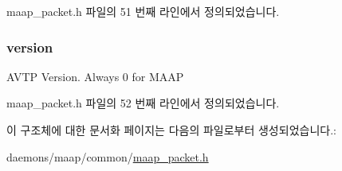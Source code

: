 maap\+\_\+packet.\+h 파일의 51 번째 라인에서 정의되었습니다.

\subsubsection[{\texorpdfstring{version}{version}}]{ version}\hypertarget{struct_m_a_a_p___packet_ab22abc2906422da61885ac6c8e6a1a59}{}\label{struct_m_a_a_p___packet_ab22abc2906422da61885ac6c8e6a1a59}
A\+V\+TP Version. Always 0 for M\+A\+AP 

maap\+\_\+packet.\+h 파일의 52 번째 라인에서 정의되었습니다.



이 구조체에 대한 문서화 페이지는 다음의 파일로부터 생성되었습니다.\+:\begin{DoxyCompactItemize}
\item 
daemons/maap/common/\hyperlink{maap__packet_8h}{maap\+\_\+packet.\+h}\end{DoxyCompactItemize}
